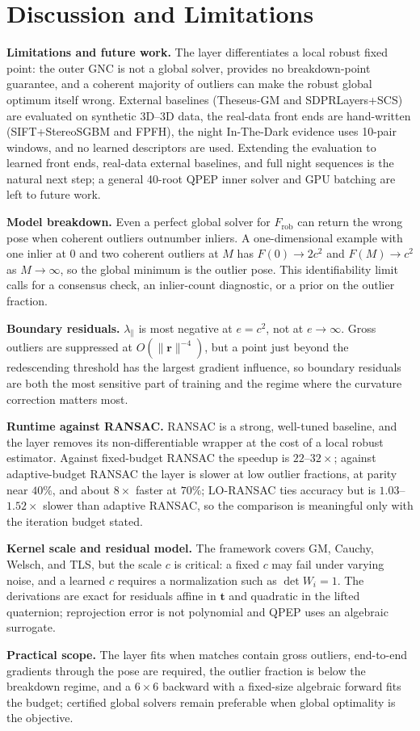 \section{Discussion and Limitations}
\label{sec:discussion}

\noindent\textbf{Limitations and future work.} The layer differentiates a local robust fixed point:
the outer GNC is not a global solver, provides no breakdown-point guarantee, and a coherent
majority of outliers can make the robust global optimum itself wrong. External baselines
(Theseus-GM and SDPRLayers+SCS) are evaluated on synthetic 3D--3D data, the real-data front ends are
hand-written (SIFT+StereoSGBM and FPFH), the night In-The-Dark evidence uses 10-pair windows, and no
learned descriptors are used. Extending the evaluation to learned front ends, real-data external
baselines, and full night sequences is the natural next step; a general 40-root QPEP inner solver
and GPU batching are left to future work.

\noindent\textbf{Model breakdown.} Even a perfect global solver for $F_{\mathrm{rob}}$ can return
the wrong pose when coherent outliers outnumber inliers. A one-dimensional example with one inlier
at $0$ and two coherent outliers at $M$ has $F(0)\to2c^2$ and $F(M)\to c^2$ as $M\to\infty$, so the
global minimum is the outlier pose. This identifiability limit calls for a consensus check, an
inlier-count diagnostic, or a prior on the outlier fraction.

\noindent\textbf{Boundary residuals.} $\lambda_\parallel$ is most negative at $e=c^2$, not at
$e\to\infty$. Gross outliers are suppressed at $O(\|\mathbf{r}\|^{-4})$, but a point just beyond the
redescending threshold has the largest gradient influence, so boundary residuals are both the most
sensitive part of training and the regime where the curvature correction matters most.

\noindent\textbf{Runtime against RANSAC.} RANSAC is a strong, well-tuned baseline, and the layer
removes its non-differentiable wrapper at the cost of a local robust estimator. Against fixed-budget
RANSAC the speedup is $22$--$32\times$; against adaptive-budget RANSAC the layer is slower at low
outlier fractions, at parity near $40\%$, and about $8\times$ faster at $70\%$; LO-RANSAC ties
accuracy but is $1.03$--$1.52\times$ slower than adaptive RANSAC, so the comparison is meaningful
only with the iteration budget stated.

\noindent\textbf{Kernel scale and residual model.} The framework covers GM, Cauchy, Welsch, and TLS,
but the scale $c$ is critical: a fixed $c$ may fail under varying noise, and a learned $c$ requires
a normalization such as $\det W_i=1$. The derivations are exact for residuals affine in
$\mathbf{t}$ and quadratic in the lifted quaternion; reprojection error is not polynomial and QPEP
uses an algebraic surrogate.

\noindent\textbf{Practical scope.} The layer fits when matches contain gross outliers, end-to-end
gradients through the pose are required, the outlier fraction is below the breakdown regime, and a
$6\times6$ backward with a fixed-size algebraic forward fits the budget; certified global solvers
remain preferable when global optimality is the objective.
